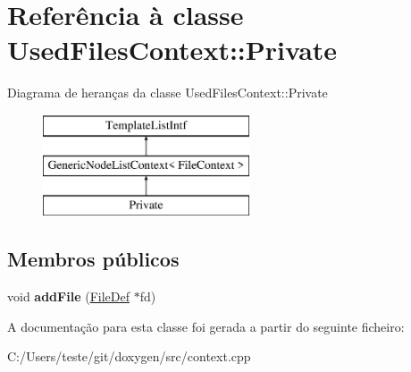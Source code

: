 \hypertarget{class_used_files_context_1_1_private}{\section{Referência à classe Used\-Files\-Context\-:\-:Private}
\label{class_used_files_context_1_1_private}
}
Diagrama de heranças da classe Used\-Files\-Context\-:\-:Private\begin{figure}[H]
\begin{center}
\leavevmode
\includegraphics[height=3.000000cm]{class_used_files_context_1_1_private}
\end{center}
\end{figure}
\subsection*{Membros públicos}
\begin{DoxyCompactItemize}
\item 
\hypertarget{class_used_files_context_1_1_private_af3efe9b1bf1318fd627ece0d7e8bac04}{void {\bfseries add\-File} (\hyperlink{class_file_def}{File\-Def} $\ast$fd)}\label{class_used_files_context_1_1_private_af3efe9b1bf1318fd627ece0d7e8bac04}

\end{DoxyCompactItemize}


A documentação para esta classe foi gerada a partir do seguinte ficheiro\-:\begin{DoxyCompactItemize}
\item 
C\-:/\-Users/teste/git/doxygen/src/context.\-cpp\end{DoxyCompactItemize}
